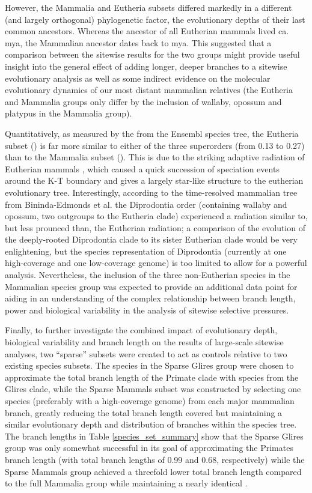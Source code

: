 However, the Mammalia and Eutheria subsets differed markedly in a
different (and largely orthogonal) phylogenetic factor, the
evolutionary depths of their last common ancestors. Whereas the
ancestor of all Eutherian mammals lived ca.  mya, the
Mammalian ancestor dates back to  mya. This suggested that a
comparison between the sitewise results for the two groups might
provide useful insight into the general effect of adding longer,
deeper branches to a sitewise evolutionary analysis as well as some
indirect evidence on the molecular evolutionary dynamics of our most
distant mammalian relatives (the Eutheria and Mammalia groups only
differ by the inclusion of wallaby, opossum and platypus in the
Mammalia group).

Quantitatively, as measured by the \mpl from the Ensembl species tree,
the Eutheria subset () is far more similar to either of the
three superorders (\mpl from 0.13 to 0.27) than to the Mammalia subset
(). This is due to the striking adaptive radiation of
Eutherian mammals \citep{todo, Archibald science 1999
  10.1126/science.285.5436.2031a and Bininda-Edmonds et al. nature
  2007}, which caused a quick succession of speciation events around
the K-T boundary and gives a largely star-like structure to the
eutherian evolutionary tree. Interestingly, according to the
time-resolved mammalian tree from Bininda-Edmonds et
al. \citeyearpar{todo} the Diprodontia order (containing wallaby and
opossum, two outgroups to the Eutheria clade) experienced a radiation
similar to, but less prounced than, the Eutherian radiation; a
comparison of the evolution of the deeply-rooted Diprodontia clade to
its sister Eutherian clade would be very enlightening, but the species
representation of Diprodontia (currently at one high-coverage and one
low-coverage genome) is too limited to allow for a powerful
analysis. Nevertheless, the inclusion of the three non-Eutherian
species in the Mammalian species group was expected to provide an
additional data point for aiding in an understanding of the complex
relationship between branch length, power and biological variability
in the analysis of sitewise selective pressures.

Finally, to further investigate the combined impact of evolutionary
depth, biological variability and branch length on the results of
large-scale sitewise analyses, two ``sparse'' subsets were created to
act as controls relative to two existing species subsets. The species
in the Sparse Glires group were chosen to approximate the total branch
length of the Primate clade with species from the Glires clade, while
the Sparse Mammals subset was constructed by selecting one species
(preferably with a high-coverage genome) from each major mammalian
branch, greatly reducing the total branch length covered but
maintaining a similar evolutionary depth and distribution of branches
within the species tree. The branch lengths in Table
\ref{species_set_summary} show that the Sparse Glires group was only
somewhat successful in its goal of approximating the Primates branch
length (with total branch lengths of 0.99 and 0.68, respectively)
while the Sparse Mammals group achieved a threefold lower total branch
length compared to the full Mammalia group while maintaining a nearly
identical \mpl.

